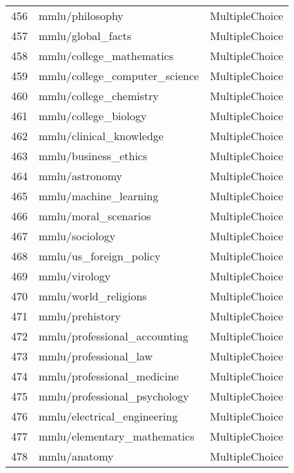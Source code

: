 \documentclass[11pt]{article}
\begin{document}
\begin{longtable}{lll}
456 & mmlu/philosophy \citep{hendryckstest2021} & MultipleChoice \\
457 & mmlu/global\_facts \citep{hendryckstest2021} & MultipleChoice \\
458 & mmlu/college\_mathematics \citep{hendryckstest2021} & MultipleChoice \\
459 & mmlu/college\_computer\_science \citep{hendryckstest2021} & MultipleChoice \\
460 & mmlu/college\_chemistry \citep{hendryckstest2021} & MultipleChoice \\
461 & mmlu/college\_biology \citep{hendryckstest2021} & MultipleChoice \\
462 & mmlu/clinical\_knowledge \citep{hendryckstest2021} & MultipleChoice \\
463 & mmlu/business\_ethics \citep{hendryckstest2021} & MultipleChoice \\
464 & mmlu/astronomy \citep{hendryckstest2021} & MultipleChoice \\
465 & mmlu/machine\_learning \citep{hendryckstest2021} & MultipleChoice \\
466 & mmlu/moral\_scenarios \citep{hendryckstest2021} & MultipleChoice \\
467 & mmlu/sociology \citep{hendryckstest2021} & MultipleChoice \\
468 & mmlu/us\_foreign\_policy \citep{hendryckstest2021} & MultipleChoice \\
469 & mmlu/virology \citep{hendryckstest2021} & MultipleChoice \\
470 & mmlu/world\_religions \citep{hendryckstest2021} & MultipleChoice \\
471 & mmlu/prehistory \citep{hendryckstest2021} & MultipleChoice \\
472 & mmlu/professional\_accounting \citep{hendryckstest2021} & MultipleChoice \\
473 & mmlu/professional\_law \citep{hendryckstest2021} & MultipleChoice \\
474 & mmlu/professional\_medicine \citep{hendryckstest2021} & MultipleChoice \\
475 & mmlu/professional\_psychology \citep{hendryckstest2021} & MultipleChoice \\
476 & mmlu/electrical\_engineering \citep{hendryckstest2021} & MultipleChoice \\
477 & mmlu/elementary\_mathematics \citep{hendryckstest2021} & MultipleChoice \\
478 & mmlu/anatomy \citep{hendryckstest2021} & MultipleChoice \\

\end{longtable}
\end{document}
